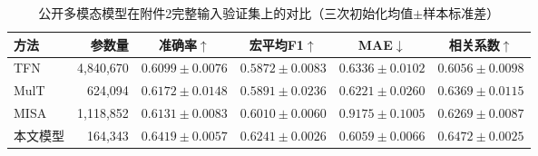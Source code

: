 \begin{table}[htbp]
\centering\small\setlength{\tabcolsep}{4pt}
\caption{公开多模态模型在附件2完整输入验证集上的对比（三次初始化均值$\pm$样本标准差）}
\label{tab:q2_public_baselines}
\begin{tabular}{@{}lrcccc@{}}
\toprule
方法 & 参数量 & 准确率$\uparrow$ & 宏平均F1$\uparrow$ & MAE$\downarrow$ & 相关系数$\uparrow$\\
\midrule
TFN & 4,840,670 & $0.6099\pm0.0076$ & $0.5872\pm0.0083$ & $0.6336\pm0.0102$ & $0.6056\pm0.0098$\\
MulT & 624,094 & $0.6172\pm0.0148$ & $0.5891\pm0.0236$ & $0.6221\pm0.0260$ & $0.6369\pm0.0115$\\
MISA & 1,118,852 & $0.6131\pm0.0083$ & $0.6010\pm0.0060$ & $0.9175\pm0.1005$ & $0.6269\pm0.0087$\\
本文模型 & 164,343 & $0.6419\pm0.0057$ & $0.6241\pm0.0026$ & $0.6059\pm0.0066$ & $0.6472\pm0.0025$\\
\bottomrule
\end{tabular}
\end{table}
